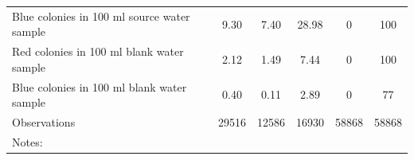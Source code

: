 \begin{table}[htbp]
\begin{tabular}{l*{5}{c}}
Blue colonies in 100 ml source water sample&        9.30&        7.40&       28.98&        0 &      100 \\
Red colonies in 100 ml blank water sample&        2.12&        1.49&        7.44&        0 &      100 \\
Blue colonies in 100 ml blank water sample&        0.40&        0.11&        2.89&        0 &       77 \\
\hline
Observations        &       29516&       12586&       16930&       58868&       58868\\
\hline\hline
\multicolumn{6}{p{0.95\linewidth}}{\scriptsize Notes: }\\
\end{tabular}
\end{table}
